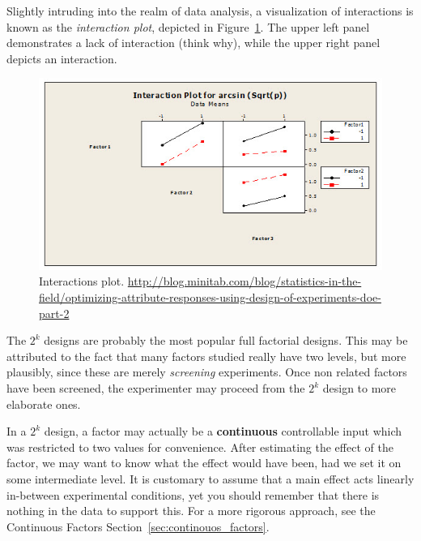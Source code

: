 
Slightly intruding into the realm of data analysis, a visualization of interactions is known as the \emph{interaction plot}, depicted in Figure~\ref{fig:interaction_plot}. 
The upper left panel demonstrates a lack of interaction (think why), while the upper right panel depicts an interaction.
\begin{figure}[ht]
\centering
\includegraphics[width=0.3\textheight]{art/attribute_doe_interaction_plot}
\caption[Interactions plot]{Interactions plot. \newline \url{http://blog.minitab.com/blog/statistics-in-the-field/optimizing-attribute-responses-using-design-of-experiments-doe-part-2}}
\label{fig:interaction_plot}
\end{figure}


\begin{remark}[Popularity of $2^k$]
The $2^k$ designs are probably the most popular full factorial designs. 
This may be attributed to the fact that many factors studied really have two levels, but more plausibly, since these are merely \emph{screening} experiments. 
Once non related factors have been screened, the experimenter may proceed from the $2^k$ design to more elaborate ones. 
\end{remark}



\begin{extra}
In a $2^k$ design, a factor may actually be a \textbf{continuous} controllable input which was restricted to two values for convenience. 
After estimating the effect of the factor, we may want to know what the effect would have been, had we set it on some intermediate level.
It is customary to assume that a main effect acts linearly in-between experimental conditions, yet you should remember that there is nothing in the data to support this.
For a more rigorous approach, see the Continuous Factors Section~\ref{sec:continouos_factors}.
\end{extra}





